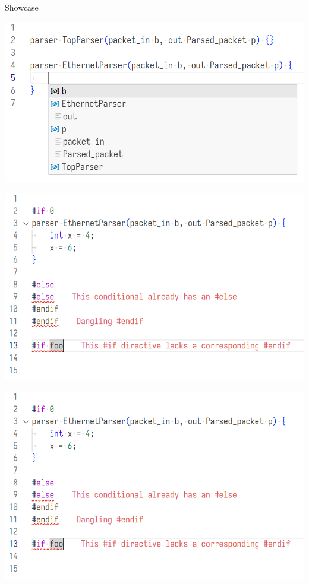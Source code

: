 \documentclass[aspectratio=169]{beamer}
\begin{document}
\begin{frame}{Showcase}
	\begin{overprint}
	 {
		\includegraphics[width=\textwidth]{resources/p4analyzer-autocompletion.png}
	}

	 {
		\includegraphics[width=\textwidth]{resources/p4analyzer-preprocessor-errors.png}
	}

	 {
		\includegraphics[width=\textwidth]{resources/p4analyzer-preprocessor-errors.png}
	}
	\end{overprint}
\end{frame}
\end{document}
